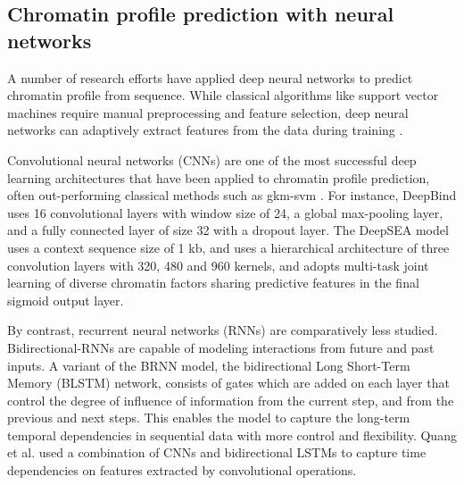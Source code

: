 \documentclass{article}
\begin{document}
\subsection{Chromatin profile prediction with neural networks}

A number of research efforts have applied deep neural networks to predict chromatin profile from sequence.  While classical algorithms like support vector machines require manual preprocessing and feature selection, deep neural networks can adaptively extract features from the data during training \cite{kelley2016basset}.

Convolutional neural networks (CNNs) are one of the most successful deep learning architectures that have been applied to chromatin profile prediction, often out-performing classical methods such as gkm-svm \cite{kelley2016basset} \cite{zhou2015predicting} \cite{deepBind}. For instance, DeepBind \cite{deepBind} uses 16 convolutional layers with window size of 24, a global max-pooling layer, and a fully connected layer of size 32 with a dropout layer.  The DeepSEA model \cite{zhou2015predicting} uses a context sequence size of 1 kb, and uses a  hierarchical architecture of three convolution layers with 320, 480 and 960 kernels, and adopts multi-task joint learning of diverse chromatin factors sharing predictive features in the final sigmoid output layer.

By contrast, recurrent neural networks (RNNs) are comparatively less studied.  Bidirectional-RNNs \cite{BRNN} are capable of modeling interactions from future and past inputs. A variant of the BRNN model, the bidirectional Long Short-Term Memory (BLSTM) network, consists of gates which are added on each layer that control the degree of influence of information from the current step, and from the previous and next steps. This enables the model to capture the long-term temporal dependencies in sequential data with more control and flexibility.  Quang et al. \cite{quang2016danq} used a combination of CNNs and bidirectional LSTMs to capture time dependencies on features extracted by convolutional operations.
\end{document}
